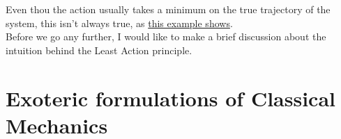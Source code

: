 \documentclass[english, a4paper,12pt]{Iart}
\theoremstyle{plain} %
\theoremstyle{remark}
\theoremstyle{definition}
\begin{document}
		Even thou the action usually takes a minimum on the true trajectory of the system, this isn't always true, as \href{http://www.eftaylor.com/pub/Gray&TaylorAJP.pdf}{this example shows}.\\
		
		Before we go any further, I would like to make a brief discussion about the intuition behind the Least Action principle.
		
	
	
	
	\chapter{Exoteric formulations of Classical Mechanics}
			
	

	
\end{document}
